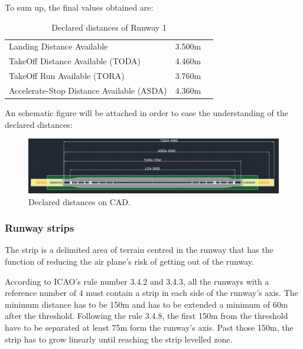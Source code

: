 			To sum up, the final values obtained are:
			
			\begin{table}[htb]
				\centering
				\begin{tabular}{ll p{5cm}}
					\midrule[1pt]
					Landing Distance Available & 3.500m\\
					TakeOff Distance Available (TODA) & 4.460m\\
					TakeOff Run Available (TORA)& 3.760m \\
					Accelerate-Stop Distance Available (ASDA)& 4.360m\\
					\bottomrule[2pt]
				\end{tabular}
				\caption{Declared distances of  Runway 1}
				\label{DeclareddistancesRW1}
			\end{table}
			
			An schematic figure will be attached in order to ease the understanding of the declared distances:
			
			\begin{figure}[H]
				\centering
				\includegraphics[clip, trim=0cm 0cm 0cm 0cm, width=1\textwidth]{./images/declareddistances/pista}
				\caption{Declared distances on CAD.} %
				\label{} %
			\end{figure}
			
			\subsubsection{Runway strips}
			The strip is a delimited area of terrain centred in the runway that has the function of reducing the air plane's risk of getting out of the runway.
			
			According to ICAO's rule number 3.4.2 and 3.4.3, all the runways with a reference number of 4 must contain a strip in each side of the runway's axis. The minimum distance has to be 150m and has to be extended a minimum of 60m after the threshold. 
			Following the rule 3.4.8, the first 150m from the threshold have to be separated at least 75m form the runway's axis. Past those 150m, the strip has to grow linearly until reaching the strip levelled zone.      
			
